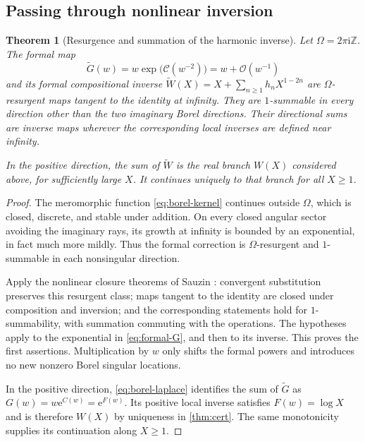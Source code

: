 \documentclass[11pt,a4paper]{article}
\newtheorem{theorem}{Theorem}[section]
\theoremstyle{definition}
\numberwithin{equation}{section}
\newcommand{\ii}{\mathrm{i}}
\newcommand{\ee}{\mathrm{e}}
\newcommand{\Oh}{\mathcal O}
\newcommand{\cformal}{\mathscr C}
\begin{document}
\subsection{Passing through nonlinear inversion}
\begin{theorem}[Resurgence and summation of the harmonic inverse]
\label{thm:resurgence}
Let $\Omega=2\pi\ii\mathbb Z$. The formal map
\begin{equation}
 \widetilde G(w)=w\exp\bigl(\cformal(w^{-2})\bigr)=w+\Oh(w^{-1})
 \label{eq:formal-G}
\end{equation}
and its formal compositional inverse
$\widetilde W(X)=X+\sum_{n\ge1}h_nX^{1-2n}$ are $\Omega$-resurgent maps tangent to the identity at infinity. They are $1$-summable in every direction other than the two imaginary Borel directions. Their directional sums are inverse maps wherever the corresponding local inverses are defined near infinity.

In the positive direction, the sum of $\widetilde W$ is the real branch $W(X)$ considered above, for sufficiently large $X$. It continues uniquely to that branch for all $X\ge1$.
\end{theorem}
\begin{proof}
The meromorphic function \eqref{eq:borel-kernel} continues outside $\Omega$, which is closed, discrete, and stable under addition. On every closed angular sector avoiding the imaginary rays, its growth at infinity is bounded by an exponential, in fact much more mildly. Thus the formal correction is $\Omega$-resurgent and $1$-summable in each nonsingular direction.

Apply the nonlinear closure theorems of Sauzin \cite[Theorems 3, 5 and $5'$]{sauzin}: convergent substitution preserves this resurgent class; maps tangent to the identity are closed under composition and inversion; and the corresponding statements hold for $1$-summability, with summation commuting with the operations. The hypotheses apply to the exponential in \eqref{eq:formal-G}, and then to its inverse. This proves the first assertions. Multiplication by $w$ only shifts the formal powers and introduces no new nonzero Borel singular locations.

In the positive direction, \eqref{eq:borel-laplace} identifies the sum of $\widetilde G$ as $G(w)=w\ee^{C(w)}=\ee^{F(w)}$. Its positive local inverse satisfies $F(w)=\log X$ and is therefore $W(X)$ by uniqueness in \cref{thm:cert}. The same monotonicity supplies its continuation along $X\ge1$.
\end{proof}
\end{document}
